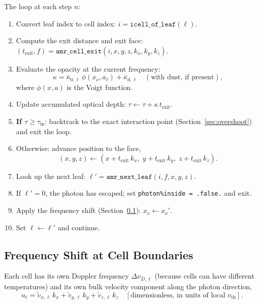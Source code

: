 \documentclass[english,a4paper]{my_memo}
\begin{document}
The loop at each step $n$:
\begin{enumerate}
  \item Convert leaf index to cell index:
        $i = \texttt{icell\_of\_leaf}(\ell)$.
  \item Compute the exit distance and exit face:
        $(t_\mathrm{exit}, f) = \texttt{amr\_cell\_exit}(i, x, y, z, k_x, k_y, k_z)$.
  \item Evaluate the opacity at the current frequency:
        \begin{equation}
          \kappa = \bar\kappa_{0,\ell}\,\phi(x_\nu, a_\ell)
                  + \bar\kappa_{d,\ell}
                  \quad (\text{with dust, if present}),
        \end{equation}
        where $\phi(x, a)$ is the Voigt function.
  \item Update accumulated optical depth:
        $\tau \leftarrow \tau + \kappa\,t_\mathrm{exit}$.
  \item \textbf{If $\tau \ge \tau_\mathrm{in}$}: backtrack to the exact
        interaction point (Section~\ref{sec:overshoot}) and exit the loop.
  \item Otherwise: advance position to the face,
        \begin{equation}
          (x, y, z) \leftarrow (x + t_\mathrm{exit}\,k_x,\;
                                 y + t_\mathrm{exit}\,k_y,\;
                                 z + t_\mathrm{exit}\,k_z).
        \end{equation}
  \item Look up the next leaf:
        $\ell' = \texttt{amr\_next\_leaf}(i, f, x, y, z)$.
  \item If $\ell' = 0$, the photon has escaped; set
        \texttt{photon\%inside = .false.} and exit.
  \item Apply the frequency shift (Section~\ref{sec:freqshift}):
        $x_\nu \leftarrow x_\nu'$.
  \item Set $\ell \leftarrow \ell'$ and continue.
\end{enumerate}

\subsection{Frequency Shift at Cell Boundaries}
\label{sec:freqshift}

Each cell has its own Doppler frequency $\Delta\nu_{D,\ell}$ (because cells
can have different temperatures) and its own bulk velocity component along the
photon direction,
\begin{equation}
  u_\ell = \tilde{v}_{x,\ell}\,k_x
          + \tilde{v}_{y,\ell}\,k_y
          + \tilde{v}_{z,\ell}\,k_z
  \quad [\text{dimensionless, in units of local } v_\mathrm{th}].
\end{equation}
\end{document}

